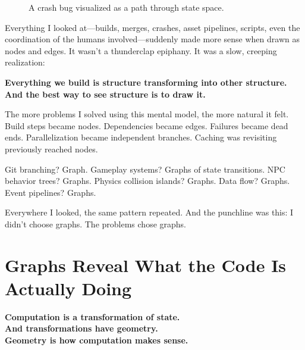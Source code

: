 \begin{figure}[h]
    \centering

    \caption{A crash bug visualized as a path through state space.}
    \label{fig:crash-path}
\end{figure}

Everything I looked at—builds, merges, crashes, asset pipelines, scripts, even the coordination of the humans involved—suddenly made more sense when drawn as nodes and edges. It wasn't a thunderclap epiphany. It was a slow, creeping realization:

\textbf{Everything we build is structure transforming into other structure. And the best way to see structure is to draw it.}

The more problems I solved using this mental model, the more natural it felt. Build steps became nodes. Dependencies became edges. Failures became dead ends. Parallelization became independent branches. Caching was revisiting previously reached nodes.

Git branching? Graph.  
Gameplay systems? Graphs of state transitions.  
NPC behavior trees? Graphs.  
Physics collision islands? Graphs.  
Data flow? Graphs.  
Event pipelines? Graphs.  

Everywhere I looked, the same pattern repeated. And the punchline was this: I didn't choose graphs. The problems chose graphs.

\section{Graphs Reveal What the Code Is Actually Doing}
\label{sec:graphs-reveal}

\begin{center}
{\LARGE\bfseries Computation is a transformation of state.}\\[6pt]
{\Large\bfseries And transformations have geometry.}\\[6pt]
{\large\bfseries Geometry is how computation makes sense.}
\end{center}

